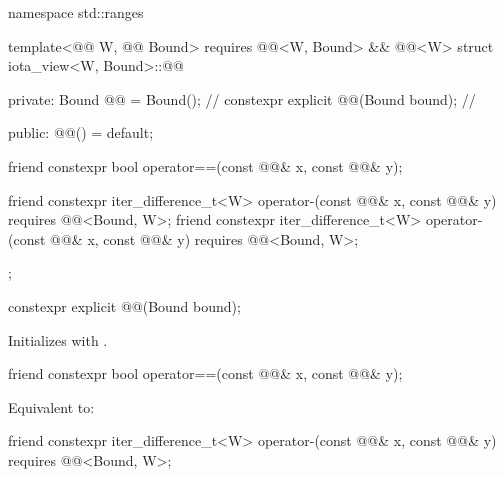 %
\begin{codeblock}
namespace std::ranges {
  template<@@ W, @@ Bound>
    requires @@<W, Bound> && @@<W>
  struct iota_view<W, Bound>::@@ {
  private:
    Bound @@ = Bound();                     // \expos
    constexpr explicit @@(Bound bound);   // \expos

  public:
    @@() = default;

    friend constexpr bool operator==(const @@& x, const @@& y);

    friend constexpr iter_difference_t<W> operator-(const @@& x, const @@& y)
      requires @@<Bound, W>;
    friend constexpr iter_difference_t<W> operator-(const @@& x, const @@& y)
      requires @@<Bound, W>;
  };
}
\end{codeblock}

\begin{itemdecl}
constexpr explicit @@(Bound bound);
\end{itemdecl}

\begin{itemdescr}
\pnum
\effects
Initializes  with .
\end{itemdescr}

\begin{itemdecl}
friend constexpr bool operator==(const @@& x, const @@& y);
\end{itemdecl}

\begin{itemdescr}
\pnum
\effects
Equivalent to: 
\end{itemdescr}

\begin{itemdecl}
friend constexpr iter_difference_t<W> operator-(const @@& x, const @@& y)
  requires @@<Bound, W>;
\end{itemdecl}


